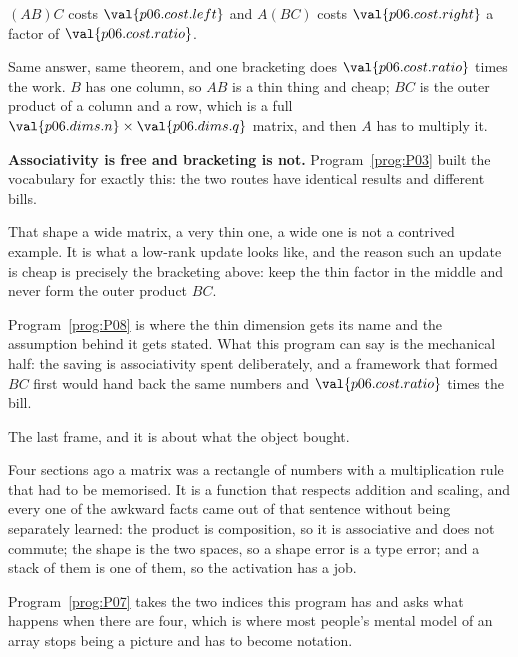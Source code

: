 \begin{fr}
\begin{ansblock}
$(AB)C$ costs $\val{p06.cost.left}$ and $A(BC)$ costs
$\val{p06.cost.right}$ \dash{} a factor of $\val{p06.cost.ratio}$.
\end{ansblock}

Same answer, same theorem, and one bracketing does
$\val{p06.cost.ratio}$ times the work. $B$ has one column, so $AB$ is a thin
thing and cheap; $BC$ is the outer product of a column and a row, which is a
full $\val{p06.dims.n} \times \val{p06.dims.q}$ matrix, and then $A$ has to
multiply it.

\textbf{Associativity is free and bracketing is not.} Program~\ref{prog:P03}
built the vocabulary for exactly this: the two routes have identical results
and different bills.
\end{fr}

\begin{fr}
\begin{aibox}
That shape \dash{} a wide matrix, a very thin one, a wide one \dash{} is not a
contrived example. It is what a low-rank update looks like, and the reason such
an update is cheap is precisely the bracketing above: keep the thin factor in
the middle and never form the outer product $BC$.

Program~\ref{prog:P08} is where the thin dimension gets its name and the
assumption behind it gets stated. What this program can say is the mechanical
half: the saving is associativity spent deliberately, and a framework that
formed $BC$ first would hand back the same numbers and
$\val{p06.cost.ratio}$ times the bill.
\end{aibox}
\end{fr}

\begin{fr}
The last frame, and it is about what the object bought.

Four sections ago a matrix was a rectangle of numbers with a multiplication
rule that had to be memorised. It is a function that respects addition and
scaling, and every one of the awkward facts came out of that sentence without
being separately learned: the product is composition, so it is associative and
does not commute; the shape is the two spaces, so a shape error is a type
error; and a stack of them is one of them, so the activation has a job.

Program~\ref{prog:P07} takes the two indices this program has and asks what
happens when there are four, which is where most people's mental model of an
array stops being a picture and has to become notation.
\end{fr}

